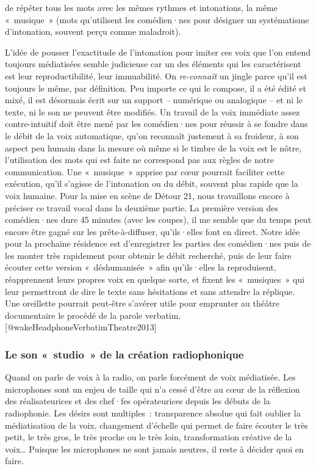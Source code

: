 \documentclass[
]{article}
\begin{document}
de répéter tous les mots avec les mêmes rythmes et intonations, la même «~musique~» (mots qu'utilisent les comédien·nes pour désigner un systématisme d'intonation, souvent perçu comme maladroit).

L'idée de pousser l'exactitude de l'intonation pour imiter ces voix que l'on entend toujours médiatisées semble judicieuse car un des éléments qui les caractérisent est leur reproductibilité, leur immuabilité. On \emph{re-connaît} un jingle parce qu'il est toujours le même, par définition. Peu importe ce qui le compose, il a été édité et mixé, il est désormais écrit sur un support -- numérique ou analogique -- et ni le texte, ni le son ne peuvent être modifiés. Un travail de la voix immédiate assez contre-intuitif doit être mené par les comédien·nes pour réussir à se fondre dans le débit de la voix automatique, qu'on reconnaît justement à sa froideur, à son aspect peu humain dans la mesure où même si le timbre de la voix est le nôtre, l'utilisation des mots qui est faite ne correspond pas aux règles de notre communication. Une «~musique~» apprise par cœur pourrait faciliter cette exécution, qu'il s'agisse de l'intonation ou du débit, souvent plus rapide que la voix humaine. Pour la mise en scène de Détour 21, nous travaillons encore à préciser ce travail vocal dans la deuxième partie. La première version des comédien·nes dure 45 minutes (avec les coupes), il me semble que du temps peut encore être gagné sur les prêts-à-diffuser, qu'ils·elles font en direct. Notre idée pour la prochaine résidence est d'enregistrer les parties des comédien·nes puis de les monter très rapidement pour obtenir le débit recherché, puis de leur faire écouter cette version «~déshumanisée~» afin qu'ils·elles la reproduisent, réapprennent leurs propres voix en quelque sorte, et fixent les «~musiques~» qui leur permettront de dire le texte sans hésitations et sans attendre la réplique. Une oreillette pourrait peut-être s'avérer utile pour emprunter au théâtre documentaire le procédé de la parole verbatim.{[}@wakeHeadphoneVerbatimTheatre2013{]}

\subsubsection{Le son «~studio~» de la création radiophonique}\label{le-son-studio-de-la-cruxe9ation-radiophonique}

Quand on parle de voix à la radio, on parle forcément de voix médiatisée. Les microphones sont un enjeu de taille qui n'a cessé d'être au cœur de la réflexion des réalisateurices et des chef·fes opérateurices depuis les débuts de la radiophonie. Les désirs sont multiples~: transparence absolue qui fait oublier la médiatisation de la voix, changement d'échelle qui permet de faire écouter le très petit, le très gros, le très proche ou le très loin, transformation créative de la voix\ldots{} Puisque les microphones ne sont jamais neutres, il reste à décider quoi en faire.
\end{document}
